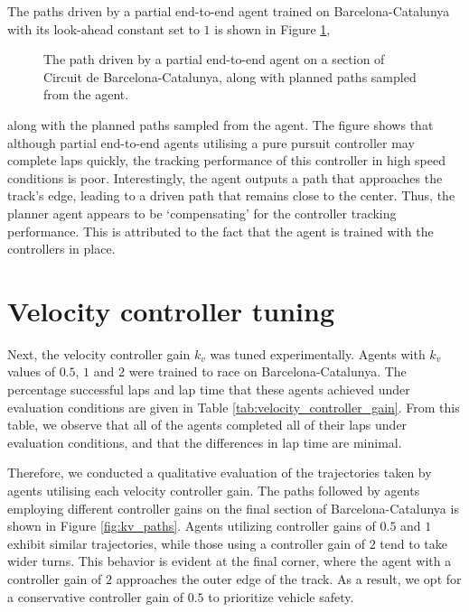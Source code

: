 The paths driven by a partial end-to-end agent trained on Barcelona-Catalunya with its look-ahead constant set to $1$ is shown in Figure \ref{fig:lfc_paths}, 
\begin{figure}[htb!]
    \centering
    
    \caption[The path driven by a partial end-to-end agent on a section of Circuit de Barcelona-Catalunya]{The path driven by a partial end-to-end agent on a section of Circuit de Barcelona-Catalunya, along with planned paths sampled from the agent.}
    \label{fig:lfc_paths}
\end{figure}
along with the planned paths sampled from the agent.
The figure shows that although partial end-to-end agents utilising a pure pursuit controller may complete laps quickly, the tracking performance of this controller in high speed conditions is poor.
Interestingly, the agent outputs a path that approaches the track's edge, leading to a driven path that remains close to the center.
Thus, the planner agent appears to be `compensating' for the controller tracking performance.
This is attributed to the fact that the agent is trained with the controllers in place.



\section{Velocity controller tuning}

Next, the velocity controller gain $k_v$ was tuned experimentally.
Agents with $k_v$ values of $0.5$, $1$ and $2$ were trained to race on Barcelona-Catalunya.
The percentage successful laps and lap time that these agents achieved under evaluation conditions are given in Table \ref{tab:velocity_controller_gain}.
From this table, we observe that all of the agents completed all of their laps under evaluation conditions, and that the differences in lap time are minimal.



Therefore, we conducted a qualitative evaluation of the trajectories taken by agents utilising each velocity controller gain.
The paths followed by agents employing different controller gains on the final section of Barcelona-Catalunya is shown in Figure \ref{fig:kv_paths}.
Agents utilizing controller gains of $0.5$ and $1$ exhibit similar trajectories, while those using a controller gain of $2$ tend to take wider turns. 
This behavior is evident at the final corner, where the agent with a controller gain of $2$ approaches the outer edge of the track. 
As a result, we opt for a conservative controller gain of $0.5$ to prioritize vehicle safety.

